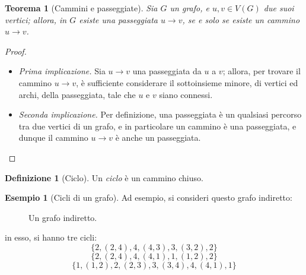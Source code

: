 \documentclass[14pt]{extreport}
\newtheorem{theorem}{Teorema}[subsection]
\theoremstyle{definition}
\newtheorem{definition}{Definizione}[subsection]
\theoremstyle{definition}
\newtheorem{example}{Esempio}[subsection]
\begin{document}
\begin{theorem}[Cammini e passeggiate]
    \label{cammini e passeggiate}
    Sia $G$ un grafo, e $u, v \in V(G)$ due suoi vertici; allora, in $G$ esiste una passeggiata $u \rightarrow v$, se e solo se esiste un cammino $u \rightarrow v$.
\end{theorem}

\begin{proof}
    \hspace{0.7cm}
    \begin{itemize}
        \item[] \textit{Prima implicazione.} Sia $u \rightarrow v$ una passeggiata da $u$ a $v$; allora, per trovare il cammino $u \rightarrow v$, è sufficiente considerare il sottoinsieme minore, di vertici ed archi, della passeggiata, tale che $u$ e $v$ siano connessi.
        \item[] \textit{Seconda implicazione.} Per definizione, una passeggiata è un qualsiasi percorso tra due vertici di un grafo, e in particolare un cammino è una passeggiata, e dunque il cammino $u \rightarrow v$ è anche un passeggiata.
    \end{itemize}
\end{proof}

\begin{definition}[Ciclo]
    Un \textit{ciclo} è un cammino chiuso.
\end{definition}

\begin{example}[Cicli di un grafo]
    Ad esempio, si consideri questo grafo indiretto:

    \begin{figure}[H]
        \centering
        \caption{Un grafo indiretto.}
    \end{figure}

    in esso, si hanno tre cicli: $$\{2, (2, 4), 4, (4,3), 3, (3, 2), 2\}$$ $$\{2, (2, 4), 4, (4, 1), 1, (1, 2), 2\}$$ $$\{1, (1, 2), 2, (2, 3), 3, (3, 4), 4, (4, 1), 1\}$$
\end{example}
\end{document}
